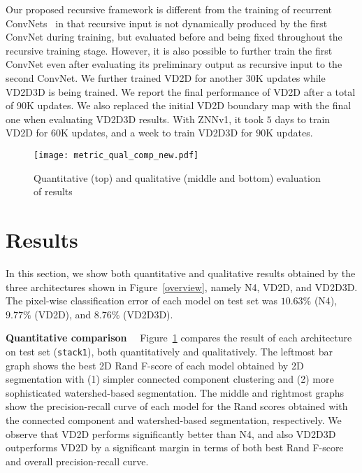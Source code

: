 \documentclass{article} %
\begin{document}
Our proposed recursive framework is different from the training of recurrent ConvNets~\cite{Pinheiro2014} in that recursive input is not dynamically produced by the first ConvNet during training, but evaluated before and being fixed throughout the recursive training stage. However, it is also possible to further train the first ConvNet even after evaluating its preliminary output as recursive input to the second ConvNet. We further trained VD2D for another $30$K updates while VD2D3D is being trained. We report the final performance of VD2D after a total of 90K updates. We also replaced the initial VD2D boundary map with the final one when evaluating VD2D3D results. With ZNNv1, it took $5$ days to train VD2D for $60$K updates, and a week to train VD2D3D for $90$K updates.

\begin{figure}[!t]
\begin{center}
\texttt{[image: metric\_qual\_comp\_new.pdf]}
\end{center}
\caption{Quantitative (top) and qualitative (middle and bottom) evaluation of results}
\label{results}
\end{figure}

\section{Results}
In this section, we show both quantitative and qualitative results obtained by the three architectures shown in Figure~\ref{overview}, namely N4, VD2D, and VD2D3D. The pixel-wise classification error of each model on test set was $10.63\%$ (N4), $9.77\%$ (VD2D), and $8.76\%$ (VD2D3D).

{\bf Quantitative comparison}$\quad$ Figure~\ref{results} compares the result of each architecture on test set (\texttt{stack1}), both quantitatively and qualitatively. The leftmost bar graph shows the best 2D Rand F-score of each model obtained by 2D segmentation with (1) simpler connected component clustering and (2) more sophisticated watershed-based segmentation. The middle and rightmost graphs show the precision-recall curve of each model for the Rand scores obtained with the connected component and watershed-based segmentation, respectively. We observe that VD2D performs significantly better than N4, and also VD2D3D outperforms VD2D by a significant margin in terms of both best Rand F-score and overall precision-recall curve.
\end{document}

